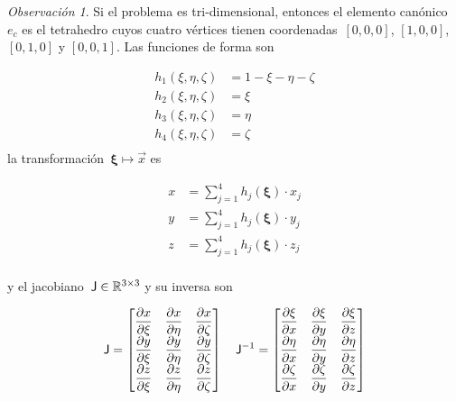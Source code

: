\documentclass[
  12pt,
  a4paper,
  table]{scrbook}
\theoremstyle{plain}
\theoremstyle{definition}
\theoremstyle{plain}
\theoremstyle{plain}
\theoremstyle{remark}
\newtheorem*{remark}{Observación}
\begin{document}
\begin{remark}

Si el problema es tri-dimensional, entonces el elemento canónico~\(e_c\)
es el tetrahedro cuyos cuatro vértices tienen coordenadas~\([0,0,0]\),
\([1,0,0]\), \([0,1,0]\) y \([0,0,1]\). Las funciones de forma son

\[
\begin{aligned}
h_1(\xi,\eta,\zeta) &= 1 - \xi - \eta - \zeta \\
h_2(\xi,\eta,\zeta) &= \xi\\
h_3(\xi,\eta,\zeta) &= \eta\\
h_4(\xi,\eta,\zeta) &= \zeta \\
\end{aligned}
\] la transformación~\(\symbf{\xi} \mapsto \vec{x}\) es

\[
\begin{aligned}
x &= \sum_{j=1}^4 h_j(\symbf{\xi}) \cdot x_j \\
y &= \sum_{j=1}^4 h_j(\symbf{\xi}) \cdot y_j \\
z &= \sum_{j=1}^4 h_j(\symbf{\xi}) \cdot z_j \\
\end{aligned}
\]

y el jacobiano~\(\mathsf{J} \in \mathbb{R}^{3 \times 3}\) y su inversa son

\[
\mathsf{J} = 
\begin{bmatrix}
\displaystyle \frac{\partial x}{\partial \xi} & \displaystyle \frac{\partial x}{\partial \eta} & \displaystyle \frac{\partial x}{\partial \zeta} \\
\displaystyle \frac{\partial y}{\partial \xi} & \displaystyle \frac{\partial y}{\partial \eta} & \displaystyle \frac{\partial y}{\partial \zeta} \\
\displaystyle \frac{\partial z}{\partial \xi} & \displaystyle \frac{\partial z}{\partial \eta} & \displaystyle \frac{\partial z}{\partial \zeta} 
\end{bmatrix}
\quad
\mathsf{J}^{-1} = 
\begin{bmatrix}
\displaystyle \frac{\partial \xi}{\partial x}   & \displaystyle \frac{\partial \xi}{\partial y}   & \displaystyle \frac{\partial \xi}{\partial z}   \\
\displaystyle \frac{\partial \eta}{\partial x}  & \displaystyle \frac{\partial \eta}{\partial y}  & \displaystyle \frac{\partial \eta}{\partial z}  \\
\displaystyle \frac{\partial \zeta}{\partial x} & \displaystyle \frac{\partial \zeta}{\partial y} & \displaystyle \frac{\partial \zeta}{\partial z}
\end{bmatrix}
\]

\end{remark}
\end{document}
